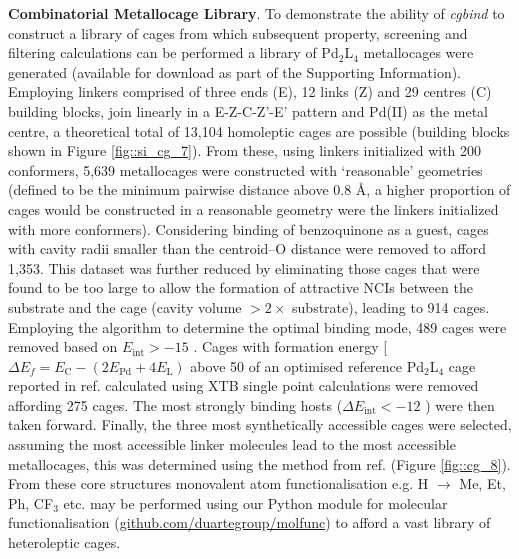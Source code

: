 \documentclass[../../main.tex]{subfiles}
\newcommand{\cgbind}{\emph{cgbind }}
\begin{document}
{\bfseries{Combinatorial Metallocage Library}}. To demonstrate the ability of \cgbind to construct a library of cages from which subsequent property, screening and filtering calculations can be performed a library of Pd$_2$L$_4$ metallocages were generated (available for download as part of the Supporting Information). Employing linkers comprised of three ends (E), 12 links (Z) and 29 centres (C) building blocks, join linearly in a E-Z-C-Z’-E’ pattern and Pd(II) as the metal centre, a theoretical total of 13,104 homoleptic cages are possible (building blocks shown in Figure \ref{fig::si_cg_7}). From these, using linkers initialized with 200 conformers, 5,639 metallocages were constructed with ‘reasonable’ geometries (defined to be the minimum pairwise distance above 0.8 \AA, a higher proportion of cages would be constructed in a reasonable geometry were the linkers initialized with more conformers). Considering binding of benzoquinone as a guest, cages with cavity radii smaller than the centroid–O distance were removed to afford 1,353. This dataset was further reduced by eliminating those cages that were found to be too large to allow the formation of attractive NCIs between the substrate and the cage (cavity volume $>2\times$ substrate), leading to 914 cages. Employing the algorithm  to determine the optimal binding mode, 489 cages were removed based on $E_\text{int} > -15$ \kcal. Cages with formation energy [$\Delta E_f = E_\text{C} - (2E_\text{Pd} + 4E_\text{L})$ above 50 \kcalx of an optimised reference Pd$_2$L$_4$ cage reported in ref. \cite{August2016} calculated using XTB single point calculations were removed affording 275 cages. The most strongly binding hosts ($\Delta E_\text{int} < -12$ \kcal) were then taken forward. Finally, the three most synthetically accessible cages were selected, assuming the most accessible linker molecules lead to the most accessible metallocages, this was determined using the method from ref. \cite{Ertl2009} (Figure \ref{fig::cg_8}). From these core structures monovalent atom functionalisation e.g. H $\rightarrow$ Me, Et, Ph, CF$_3$ etc. may be performed using our Python module for molecular functionalisation ({\url{github.com/duartegroup/molfunc}}) to afford a vast library of heteroleptic cages.
\end{document}
